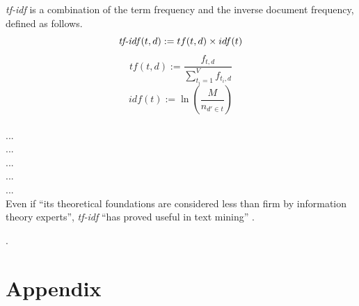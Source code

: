 \documentclass[11pt,a4paper]{article}
\begin{document}
\textit{tf-idf} is a combination of the term frequency and the inverse document frequency, defined as follows.
$$\text{\textit{tf-idf}}(t,d):=tf(t,d)\times idf(t)$$
$$tf(t,d):=\frac{f_{t,d}}{\sum_{t_i=1}^V f_{t_i,d}}$$
$$idf(t):=\ln\left(\frac{M}{n_{d'\in t}}\right)$$
\\
 		... \\
   	... \\
 ... \\
 		... \\
   	... \\
Even if “its theoretical foundations are considered less than firm by information theory experts”, \textit{tf-idf} “has proved useful in text mining” \cite{Silge2017}.








\newpage 
.
\newpage
\appendix
\section{Appendix}
	
  
  


\listoffigures
\listoftables

	
	
\end{document}
